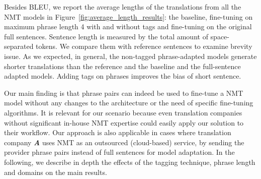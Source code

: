 Besides BLEU, we report the average lengths of the translations from all the NMT models in Figure~\ref{fig:average_length_results}: the baseline, fine-tuning on maximum phrase length 4 with and without tags and fine-tuning on the original full sentences. Sentence length is measured by the total amount of space-separated tokens. We compare them with reference sentences to examine brevity issue. As we expected, in general, the non-tagged phrase-adapted models generate shorter translations than the reference and the baseline and the full-sentence adapted models. Adding tags on phrases improves the bias of short sentence.




Our main finding is that phrase pairs can indeed be used to fine-tune a NMT model without any changes to the architecture or the need of specific fine-tuning algorithms. It is relevant for our scenario because even translation companies without significant in-house NMT expertise could easily apply our solution to their workflow. Our approach is also applicable in cases where translation company \textbf{\textit{A}} uses NMT as an outsourced (cloud-based) service, by sending the provider phrase pairs instead of full sentences for model adaptation. In the following, we describe in depth the effects of the tagging technique, phrase length and domains on the main results.


